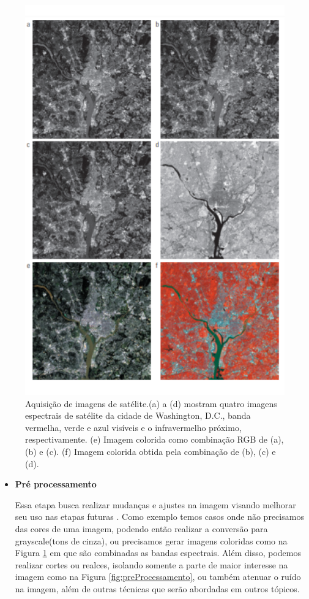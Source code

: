 \documentclass[
  brazilian,
]{book}
\begin{document}
\begin{figure}

{\centering \includegraphics[width=0.4\linewidth]{imagens/01-introducao/aquisicao} 

}

\caption{Aquisição de imagens de satélite.(a) a (d) mostram quatro imagens espectrais de satélite da cidade de Washington, D.C., banda vermelha, verde e azul visíveis e o infravermelho próximo, respectivamente. (e) Imagem colorida como combinação RGB de (a), (b) e (c). (f) Imagem colorida obtida pela combinação de (b), (c) e (d)\autocite[p.~279]{gonzalez2010}.}\label{fig:aquisicao}
\end{figure}

\begin{itemize}
\item
  \textbf{Pré processamento}

  Essa etapa busca realizar mudanças e ajustes na imagem visando melhorar seu uso nas etapas futuras \autocite[p.~3]{pedrini2008}. Como exemplo temos casos onde não precisamos das cores de uma imagem, podendo então realizar a conversão para grayscale(tons de cinza), ou precisamos gerar imagens coloridas como na Figura \ref{fig:aquisicao} em que são combinadas as bandas espectrais. Além disso, podemos realizar cortes ou realces, isolando somente a parte de maior interesse na imagem como na Figura \ref{fig:preProcessamento}, ou também atenuar o ruído na imagem, além de outras técnicas que serão abordadas em outros tópicos.
\end{itemize}
\end{document}
